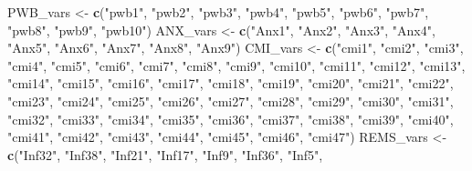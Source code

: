\documentclass[
  11pt,
]{book}
\newenvironment{Shaded}{\begin{snugshade}}{\end{snugshade}}
\newcommand{\FunctionTok}[1]{\textcolor[rgb]{0.27,0.27,0.27}{\textbf{#1}}}
\newcommand{\NormalTok}[1]{#1}
\newcommand{\OtherTok}[1]{\textcolor[rgb]{0.37,0.37,0.37}{#1}}
\newcommand{\StringTok}[1]{\textcolor[rgb]{0.5,0.5,0.5}{#1}}
\begin{document}
\begin{Shaded}
\begin{Highlighting}[]
\NormalTok{PWB\_vars }\OtherTok{\textless{}{-}} \FunctionTok{c}\NormalTok{(}\StringTok{"pwb1"}\NormalTok{, }\StringTok{"pwb2"}\NormalTok{, }\StringTok{"pwb3"}\NormalTok{, }\StringTok{"pwb4"}\NormalTok{, }\StringTok{"pwb5"}\NormalTok{, }\StringTok{"pwb6"}\NormalTok{, }\StringTok{"pwb7"}\NormalTok{, }\StringTok{"pwb8"}\NormalTok{,}
    \StringTok{"pwb9"}\NormalTok{, }\StringTok{"pwb10"}\NormalTok{)}
\NormalTok{ANX\_vars }\OtherTok{\textless{}{-}} \FunctionTok{c}\NormalTok{(}\StringTok{"Anx1"}\NormalTok{, }\StringTok{"Anx2"}\NormalTok{, }\StringTok{"Anx3"}\NormalTok{, }\StringTok{"Anx4"}\NormalTok{, }\StringTok{"Anx5"}\NormalTok{, }\StringTok{"Anx6"}\NormalTok{, }\StringTok{"Anx7"}\NormalTok{, }\StringTok{"Anx8"}\NormalTok{,}
    \StringTok{"Anx9"}\NormalTok{)}
\NormalTok{CMI\_vars }\OtherTok{\textless{}{-}} \FunctionTok{c}\NormalTok{(}\StringTok{"cmi1"}\NormalTok{, }\StringTok{"cmi2"}\NormalTok{, }\StringTok{"cmi3"}\NormalTok{, }\StringTok{"cmi4"}\NormalTok{, }\StringTok{"cmi5"}\NormalTok{, }\StringTok{"cmi6"}\NormalTok{, }\StringTok{"cmi7"}\NormalTok{, }\StringTok{"cmi8"}\NormalTok{,}
    \StringTok{"cmi9"}\NormalTok{, }\StringTok{"cmi10"}\NormalTok{, }\StringTok{"cmi11"}\NormalTok{, }\StringTok{"cmi12"}\NormalTok{, }\StringTok{"cmi13"}\NormalTok{, }\StringTok{"cmi14"}\NormalTok{, }\StringTok{"cmi15"}\NormalTok{, }\StringTok{"cmi16"}\NormalTok{,}
    \StringTok{"cmi17"}\NormalTok{, }\StringTok{"cmi18"}\NormalTok{, }\StringTok{"cmi19"}\NormalTok{, }\StringTok{"cmi20"}\NormalTok{, }\StringTok{"cmi21"}\NormalTok{, }\StringTok{"cmi22"}\NormalTok{, }\StringTok{"cmi23"}\NormalTok{, }\StringTok{"cmi24"}\NormalTok{,}
    \StringTok{"cmi25"}\NormalTok{, }\StringTok{"cmi26"}\NormalTok{, }\StringTok{"cmi27"}\NormalTok{, }\StringTok{"cmi28"}\NormalTok{, }\StringTok{"cmi29"}\NormalTok{, }\StringTok{"cmi30"}\NormalTok{, }\StringTok{"cmi31"}\NormalTok{, }\StringTok{"cmi32"}\NormalTok{,}
    \StringTok{"cmi33"}\NormalTok{, }\StringTok{"cmi34"}\NormalTok{, }\StringTok{"cmi35"}\NormalTok{, }\StringTok{"cmi36"}\NormalTok{, }\StringTok{"cmi37"}\NormalTok{, }\StringTok{"cmi38"}\NormalTok{, }\StringTok{"cmi39"}\NormalTok{, }\StringTok{"cmi40"}\NormalTok{,}
    \StringTok{"cmi41"}\NormalTok{, }\StringTok{"cmi42"}\NormalTok{, }\StringTok{"cmi43"}\NormalTok{, }\StringTok{"cmi44"}\NormalTok{, }\StringTok{"cmi45"}\NormalTok{, }\StringTok{"cmi46"}\NormalTok{, }\StringTok{"cmi47"}\NormalTok{)}
\NormalTok{REMS\_vars }\OtherTok{\textless{}{-}} \FunctionTok{c}\NormalTok{(}\StringTok{"Inf32"}\NormalTok{, }\StringTok{"Inf38"}\NormalTok{, }\StringTok{"Inf21"}\NormalTok{, }\StringTok{"Inf17"}\NormalTok{, }\StringTok{"Inf9"}\NormalTok{, }\StringTok{"Inf36"}\NormalTok{, }\StringTok{"Inf5"}\NormalTok{,}

\end{Highlighting}
\end{Shaded}
\end{document}

